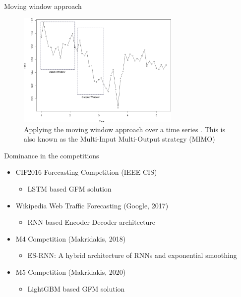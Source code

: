 \documentclass{beamer}
\begin{document}
  \begin{frame}{Moving window approach}
  	 \begin{figure}[htb]
  \begin{center}
    \includegraphics[width=0.7\textwidth]{images/window_final}
    \caption{\scriptsize Applying the moving window approach over a time series . This is also known as the Multi-Input Multi-Output strategy (MIMO)}
  \label{fig:network}
  \end{center}
\end{figure}
  \end{frame}
  

\begin{frame}{Dominance in the competitions}
   	\begin{itemize}
    			\item  CIF2016 Forecasting Competition (IEEE CIS)
  				\begin{itemize}\color{blue}
						\item LSTM based GFM solution~\cite{Smyl2016-ee}
	  			\end{itemize}
   		 	\item  Wikipedia Web Traffic Forecasting (Google, 2017)
  				\begin{itemize}\color{blue}
						\item RNN based Encoder-Decoder architecture~\cite{Suilin2018-tc}
	 			 \end{itemize}
	   		\item  M4 Competition (Makridakis, 2018)
	  			 \begin{itemize}\color{blue}
					\item ES-RNN: A hybrid architecture of RNNs and exponential smoothing~\cite{Smyl2019-cb}
	 		 	\end{itemize}
	 		\item  M5 Competition (Makridakis, 2020)
	  			 \begin{itemize}\color{blue}
					\item LightGBM based GFM solution ~\cite{Makridakis2021-ro}
	 		 	\end{itemize}
 	\end{itemize}
 \end{frame}
 
\end{document}
